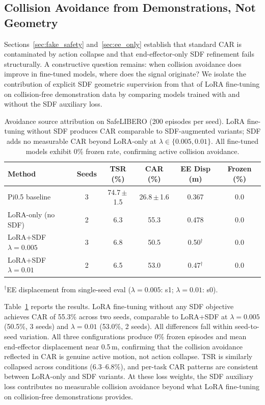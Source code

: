 \subsection{Collision Avoidance from Demonstrations, Not Geometry}\label{sec:avoidance_source}

Sections~\ref{sec:fake_safety} and~\ref{sec:ee_only} establish that standard CAR is contaminated by action collapse and that end-effector-only SDF refinement fails structurally. A constructive question remains: when collision avoidance does improve in fine-tuned models, where does the signal originate? We isolate the contribution of explicit SDF geometric supervision from that of LoRA fine-tuning on collision-free demonstration data by comparing models trained with and without the SDF auxiliary loss.

\begin{table}[t]
\centering
\caption{Avoidance source attribution on SafeLIBERO (200 episodes per seed). LoRA fine-tuning without SDF produces CAR comparable to SDF-augmented variants; SDF adds no measurable CAR beyond LoRA-only at $\lambda \in \{0.005, 0.01\}$. All fine-tuned models exhibit 0\% frozen rate, confirming active collision avoidance.}
\label{tab:avoidance_source}
\vspace{2pt}
\small
\begin{tabular}{lccccc}
\toprule
Method & Seeds & TSR (\%) & CAR (\%) & EE Disp (m) & Frozen (\%) \\
\midrule
Pi0.5 baseline & 3 & 74.7\,$\pm$\,1.5 & 26.8\,$\pm$\,1.6 & 0.367 & 0.0 \\
\midrule
LoRA-only (no SDF) & 2 & 6.3 & 55.3 & 0.478 & 0.0 \\
LoRA+SDF $\lambda{=}0.005$ & 3 & 6.8 & 50.5 & 0.50$^\dagger$ & 0.0 \\
LoRA+SDF $\lambda{=}0.01$ & 2 & 6.5 & 53.0 & 0.47$^\dagger$ & 0.0 \\
\bottomrule
\end{tabular}
\vspace{1pt}
{\footnotesize $^\dagger$EE displacement from single-seed eval ($\lambda{=}0.005$: s1; $\lambda{=}0.01$: s0).}
\end{table}

Table~\ref{tab:avoidance_source} reports the results. LoRA fine-tuning without any SDF objective achieves CAR of 55.3\% across two seeds, comparable to LoRA+SDF at $\lambda = 0.005$ (50.5\%, 3 seeds) and $\lambda = 0.01$ (53.0\%, 2 seeds). All differences fall within seed-to-seed variation. All three configurations produce 0\% frozen episodes and mean end-effector displacement near 0.5\,m, confirming that the collision avoidance reflected in CAR is genuine active motion, not action collapse. TSR is similarly collapsed across conditions (6.3--6.8\%), and per-task CAR patterns are consistent between LoRA-only and SDF variants. At these loss weights, the SDF auxiliary loss contributes no measurable collision avoidance beyond what LoRA fine-tuning on collision-free demonstrations provides.

